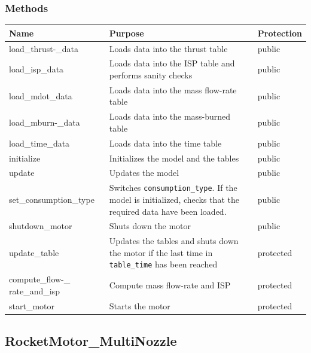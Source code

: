 \documentclass[11pt,fleqn]{report}
\begin{document}
\subsubsection{Methods}
\begin{center}
\begin{longtable}{|p{3cm}|p{10cm}|l|} \hline
\textbf{Name} & \textbf{Purpose} & \textbf{Protection} \\
\hline
\endhead
load\_thrust-\newline \_data & Loads data into the thrust table & public \\
\hline
load\_isp\_data & Loads data into the ISP table and performs sanity checks & public \\
\hline
load\_mdot\_data & Loads data into the mass flow-rate table & public \\
\hline
load\_mburn-\newline \_data & Loads data into the mass-burned table & public \\
\hline
load\_time\_data & Loads data into the time table & public \\
\hline
initialize & Initializes the model and the tables & public \\
\hline
update & Updates the model & public \\
\hline
set\_consumption\newline \_type & Switches \verb|consumption_type|. If the model is initialized, checks that the required data have been loaded. & public \\
\hline
shutdown\_motor & Shuts down the motor & public \\
\hline
update\_table & Updates the tables and shuts down the motor if the last time in \verb|table_time| has been reached & protected \\
\hline
compute\_flow-\newline \_ rate\_and\_isp & Compute mass flow-rate and ISP & protected \\
\hline
start\_motor & Starts the motor & protected \\
\hline
\end{longtable}
\end{center}

\subsection{RocketMotor\_MultiNozzle}
\end{document}
